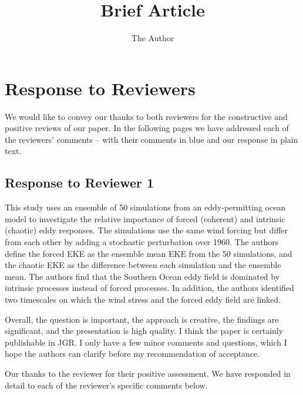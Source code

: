 \documentclass[11pt]{article}
\title{Brief Article}
\author{The Author}
\begin{document}

\section*{Response to Reviewers}
\noindent We would like to convey our thanks to both reviewers for the constructive and positive reviews of our paper. 
In the following pages we have addressed each of the reviewers' comments -- with their comments in blue and our response in plain text.

\subsection*{Response to Reviewer 1}

{\color{blue} This study uses an ensemble of 50 simulations from an eddy-permitting ocean model to investigate the relative importance of forced (coherent) and intrinsic (chaotic) eddy responses. The simulations use the same wind forcing but differ from each other by adding a stochastic perturbation over 1960. The authors define the forced EKE as the ensemble mean EKE from the 50 simulations, and the chaotic EKE as the difference between each simulation and the ensemble mean. The authors find that the Southern Ocean eddy field is dominated by intrinsic processes instead of forced processes. In addition, the authors identified two timescales on which the wind stress and the forced eddy field are linked. 

Overall, the question is important, the approach is creative, the findings are significant, and the presentation is high quality. I think the paper is certainly publishable in JGR. I only have a few minor comments and questions, which I hope the authors can clarify before my recommendation of acceptance.\\}

\noindent Our thanks to the reviewer for their positive assessment. 
We have responded in detail to each of the reviewer's specific comments below.
\end{document}
